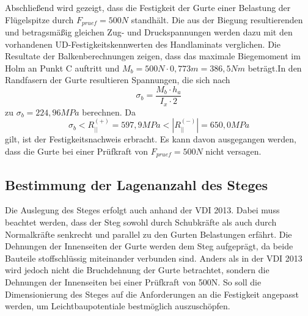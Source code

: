 \noindent Abschließend wird gezeigt, dass die Festigkeit der Gurte einer Belastung der Flügelspitze durch $ F_{pruef}=500N $ standhält. Die aus der Biegung resultierenden und betragsmäßig gleichen Zug- und Druckspannungen werden dazu mit den vorhandenen UD-Festigkeitskennwerten des Handlaminats verglichen. Die Resultate der Balkenberechnungen zeigen, dass das maximale Biegemoment im Holm an Punkt C auftritt und $ M_{b}=500N\cdot 0,773m=386,5Nm $ beträgt.In den Randfasern der Gurte resultieren Spannungen, die sich nach\\
\begin{equation}
	\sigma_{b}=\frac{M_{b}\cdot {h_{a}}}{{I_{x}}\cdot 2}
\end{equation} 
zu $ \sigma_{b}=224,96MPa $ berechnen. Da 
\begin{equation}
	\sigma_{b}< R^{(+)}_{||}=597,9 MPa < |R^{(-)}_{||}| =650,0 MPa
\end{equation} 
gilt, ist der Festigkeitsnachweis erbracht. Es kann davon ausgegangen werden, dass die Gurte bei einer Prüfkraft von $ F_{pruef}=500N $ nicht versagen. \\

\subsection{Bestimmung der Lagenanzahl des Steges}
Die Auslegung des Steges erfolgt auch anhand der VDI 2013. Dabei muss beachtet werden, dass der Steg sowohl durch Schubkräfte als auch durch Normalkräfte senkrecht und parallel zu den Gurten Belastungen erfährt. Die Dehnungen der Innenseiten der Gurte werden dem Steg aufgeprägt, da beide Bauteile stoffschlüssig miteinander verbunden sind. Anders als in der VDI 2013 wird jedoch nicht die Bruchdehnung der Gurte betrachtet, sondern die Dehnungen der Innenseiten bei einer Prüfkraft von 500N. So soll die Dimensionierung des Steges auf die Anforderungen an die Festigkeit angepasst werden, um Leichtbaupotentiale bestmöglich auszuschöpfen.\\

